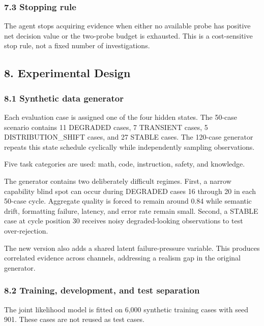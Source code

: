 \documentclass[
]{article}
\begin{document}
\subsubsection{7.3 Stopping rule}\label{73-stopping-rule}

The agent stops acquiring evidence when either no available probe has positive net decision value or the two-probe budget is exhausted. This is a cost-sensitive stop rule, not a fixed number of investigations.

\subsection{8. Experimental Design}\label{8-experimental-design}

\subsubsection{8.1 Synthetic data generator}\label{81-synthetic-data-generator}

Each evaluation case is assigned one of the four hidden states. The 50-case scenario contains 11 DEGRADED cases, 7 TRANSIENT cases, 5 DISTRIBUTION\_SHIFT cases, and 27 STABLE cases. The 120-case generator repeats this state schedule cyclically while independently sampling observations.

Five task categories are used: math, code, instruction, safety, and knowledge.

The generator contains two deliberately difficult regimes. First, a narrow capability blind spot can occur during DEGRADED cases 16 through 20 in each 50-case cycle. Aggregate quality is forced to remain around 0.84 while semantic drift, formatting failure, latency, and error rate remain small. Second, a STABLE case at cycle position 30 receives noisy degraded-looking observations to test over-rejection.

The new version also adds a shared latent failure-pressure variable. This produces correlated evidence across channels, addressing a realism gap in the original generator.

\subsubsection{8.2 Training, development, and test separation}\label{82-training-development-and-test-separation}

The joint likelihood model is fitted on 6,000 synthetic training cases with seed 901. These cases are not reused as test cases.
\end{document}
